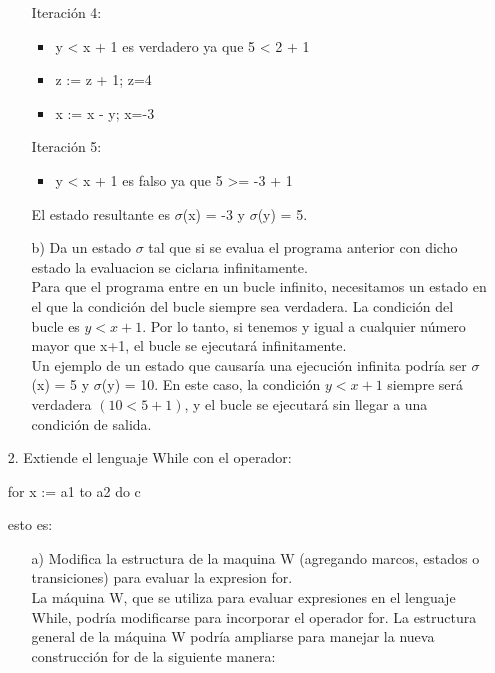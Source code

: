 \documentclass{article}
\begin{document}
\begin{itemize}
\begin{itemize}
            Iteración 4:
            \begin{itemize}
                \item y < x + 1 es verdadero ya que 5 < 2 + 1
                \item z := z + 1; z=4
                \item x := x - y; x=-3
            \end{itemize}

            Iteración 5:
            \begin{itemize}
                \item y < x + 1 es falso ya que 5 >= -3 + 1
            \end{itemize}

            El estado resultante es $\sigma$(x) = -3 y $\sigma$(y) = 5.

            \item[b)] Da un estado $\sigma$ tal que si se evalua el programa anterior con dicho estado la evaluacion se ciclarıa infinitamente.\\

            Para que el programa entre en un bucle infinito, necesitamos un estado en el que la condición del bucle siempre sea verdadera. La condición del bucle es $y<x+1$. Por lo tanto, si tenemos y igual a cualquier número mayor que x+1, el bucle se ejecutará infinitamente.\\

            Un ejemplo de un estado que causaría una ejecución infinita podría ser $\sigma$(x) = 5 y $\sigma$(y) = 10. En este caso, la condición $y<x+1$ siempre será verdadera $(10<5+1)$, y el bucle se ejecutará sin llegar a una condición de salida.
        \end{itemize}

        \item[2.] Extiende el lenguaje While con el operador:
        \begin{center}
        for x := a1 to a2 do c
        \end{center}
        esto es:
        \begin{itemize}
            \item[a)] Modifica la estructura de la maquina W (agregando marcos, estados o transiciones) para evaluar la expresion for.\\

            La máquina W, que se utiliza para evaluar expresiones en el lenguaje While, podría modificarse para incorporar el operador for. La estructura general de la máquina W podría ampliarse para manejar la nueva construcción for de la siguiente manera:


\end{itemize}
\end{itemize}
\end{document}
